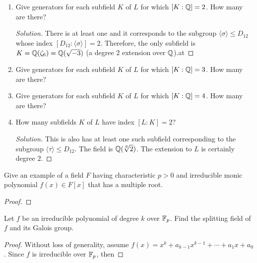 \begin{problem}
\begin{enumerate}[label=(\alph*)]
\begin{proof}[Subfield lattice]
\begin{align*}
\begin{cases}
            \sqrt[6]{2}&\longmapsto(\zeta_6^5)^5\sqrt[6]{2}
            =\zeta_6\sqrt[6]{2},\\
            \zeta_6&\longmapsto\zeta_6^5.
          \end{cases}
      \end{align*}
      Thus $\Gal(L/\bbQ)\cong D_{12}$. From here, we simply use
      the Fundamental Theorem of Galois Theory and observe the
      correspondence between subfields of $L$ and subgroups of
      $D_{12}$. (If only I knew the subgroup lattice of
      $D_{12}$).
    \end{proof}
  \item Give generators for each subfield $K$ of $L$ for which
    $[K:\mathbb{Q}]=2$. How many are there?
    \begin{proof}[Solution]
      There is at least one and it corresponds to the subgroup
      $\langle \sigma \rangle\leq D_{12}$ whose index
      $[D_{12}:\langle \sigma \rangle]=2$. Therefore, the only
      subfield is $K=\mathbb{Q}(\zeta_6)=\mathbb{Q}(\sqrt{-3})$ (a degree $2$
      extension over $\mathbb{Q}$).at
    \end{proof}
  \item Give generators for each subfield $K$ of $L$ for which
    $[K:\mathbb{Q}]=3$. How many are there?
  \item Give generators for each subfield $K$ of $L$ for which
    $[K:\mathbb{Q}]=4$. How many are there?
  \item How many subfields $K$ of $L$ have index $[L:K]=2$?
    \begin{proof}[Solution]
      This is also has at least one such subfield corresponding
      to the subgroup $\langle \tau \rangle\leq D_{12}$. The
      field is $\mathbb{Q}(\sqrt[6]{2})$. The extension to $L$ is
      certainly degree $2$.
    \end{proof}
  \end{enumerate}
\end{problem}

\begin{problem}
  Give an example of a field $F$ having characteristic $p>0$ and
  irreducible monic polynomial $f(x)\in F[x]$ that has a multiple
  root.
\begin{proof}

\end{proof}
\end{problem}

\begin{problem}
  Let $f$ be an irreducible polynomial of degree $k$ over
  $\mathbb{F}_p$. Find the splitting field of $f$ and its Galois
  group.
\begin{proof}
  Without loss of generality, assume
  $f(x)=x^k+a_{k-1}x^{k-1}+\cdots+a_1x+a_0$. Since $f$ is
  irreducible over $\mathbb{F}_p$, then
\end{proof}
\end{problem}

